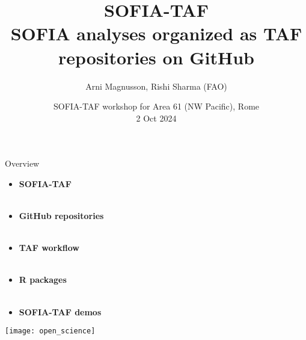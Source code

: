 \documentclass[aspectratio=169]{beamer}
\begin{document}
\begin{frame}
  \title{SOFIA-TAF\\[1ex]
    {\large\darkgreen SOFIA analyses organized as TAF repositories on GitHub}}
  \author{\vspace{-4ex}
    Arni Magnusson, Rishi Sharma (FAO)}
  \date{SOFIA-TAF workshop for Area 61 (NW Pacific), Rome\\[0.2ex]
    2 Oct 2024}
  \titlepage
\end{frame}


\begin{frame}{Overview}
  \begin{itemize}
    \item[] {\bf\darkblue SOFIA-TAF}\\[0.1ex]
    \\[2.5ex]
    \item[] {\bf\darkblue GitHub repositories}\\[0.1ex]
    \\[2.5ex]
    \item[] {\bf\darkblue TAF workflow}\\[0.1ex]
    \\[2.5ex]
    \item[] {\bf\darkblue R packages}\\[0.1ex]
    \\[2.5ex]
    \item[] {\bf\darkblue SOFIA-TAF demos}\\[0.1ex]
  \end{itemize}
\end{frame}


\begin{frame}
  \centering
  \vspace{1.5ex}
  \texttt{[image: open\_science]}
\end{frame}

\end{document}
